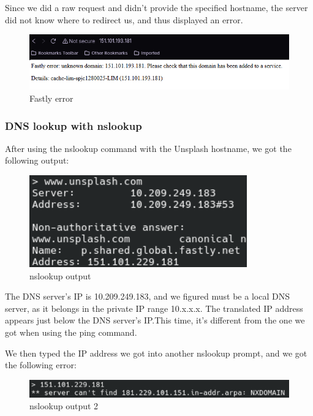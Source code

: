 Since we did a raw request and didn't provide the specified hostname, the
server did not know where to redirect us, and thus displayed an error.

\begin{figure}[htbp]
    \centering
    \includegraphics[width=1\linewidth]{img/3.png}
    \caption{Fastly error}\label{fig:3}
\end{figure}

\subsubsection{DNS lookup with nslookup}

After using the nslookup command with the Unsplash hostname, we got the
following output:

\begin{figure}[htbp]
    \centering
    \includegraphics[width=1\linewidth]{img/4.5.png}
    \caption{nslookup output}\label{fig:4}
\end{figure}

The DNS server's IP is 10.209.249.183, and we figured must be a local DNS
server, as it belongs in the private IP range 10.x.x.x. The translated IP
address appears just below the DNS server's IP.\@ This time, it's different
from the one we got when using the ping command.

We then typed the IP address we got into another nslookup prompt, and we got
the following error:

\begin{figure}[htbp]
    \centering
    \includegraphics[width=1\linewidth]{img/5.png}
    \caption{nslookup output 2}\label{fig:5}
\end{figure}

